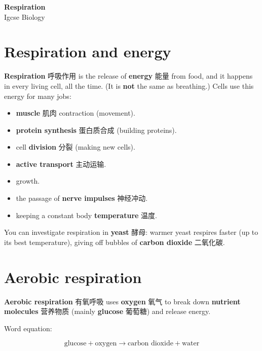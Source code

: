 \documentclass[11pt]{article}
\begin{document}
\begin{center}
  {\LARGE\bfseries Respiration}\\[0.35em]
  {\large Igcse Biology}
\end{center}
\vspace{0.6em}

\section*{Respiration and energy}

\textbf{Respiration} 呼吸作用 is the release of \textbf{energy} 能量 from food, and it happens in every living cell, all the time. (It is \textbf{not} the same as breathing.) Cells use this energy for many jobs:

\begin{itemize}
\item \textbf{muscle} 肌肉 contraction (movement).

\item \textbf{protein synthesis} 蛋白质合成 (building proteins).

\item cell \textbf{division} 分裂 (making new cells).

\item \textbf{active transport} 主动运输.

\item growth.

\item the passage of \textbf{nerve impulses} 神经冲动.

\item keeping a constant body \textbf{temperature} 温度.

\end{itemize}

You can investigate respiration in \textbf{yeast} 酵母: warmer yeast respires faster (up to its best temperature), giving off bubbles of \textbf{carbon dioxide} 二氧化碳.

\section*{Aerobic respiration}

\textbf{Aerobic respiration} 有氧呼吸 uses \textbf{oxygen} 氧气 to break down \textbf{nutrient molecules} 营养物质 (mainly \textbf{glucose} 葡萄糖) and release energy.

Word equation:

\[
\text{glucose} + \text{oxygen} \rightarrow \text{carbon dioxide} + \text{water}
\]
\end{document}
